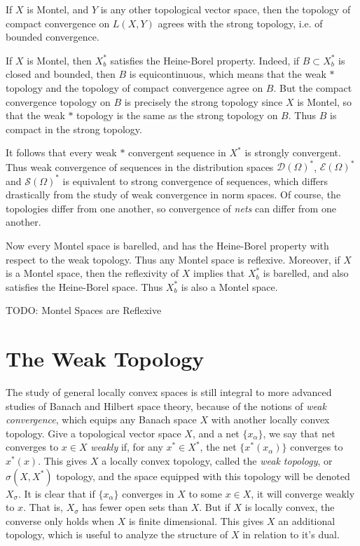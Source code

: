 \begin{theorem}
    If $X$ is Montel, and $Y$ is any other topological vector space, then the topology of compact convergence on $L(X,Y)$ agrees with the strong topology, i.e. of bounded convergence.
\end{theorem}

If $X$ is Montel, then $X^*_b$ satisfies the Heine-Borel property. Indeed, if $B \subset X^*_b$ is closed and bounded, then $B$ is equicontinuous, which means that the weak $*$ topology and the topology of compact convergence agree on $B$. But the compact convergence topology on $B$ is precisely the strong topology since $X$ is Montel, so that the weak $*$ topology is the same as the strong topology on $B$. Thus $B$ is compact in the strong topology.

It follows that every weak $*$ convergent sequence in $X^*$ is strongly convergent. Thus weak convergence of sequences in the distribution spaces $\mathcal{D}(\Omega)^*$, $\mathcal{E}(\Omega)^*$ and $\mathcal{S}(\Omega)^*$ is equivalent to strong convergence of sequences, which differs drastically from the study of weak convergence in norm spaces. Of course, the topologies differ from one another, so convergence of \emph{nets} can differ from one another.

Now every Montel space is barelled, and has the Heine-Borel property with respect to the weak topology. Thus any Montel space is reflexive. Moreover, if $X$ is a Montel space, then the reflexivity of $X$ implies that $X^*_b$ is barelled, and also satisfies the Heine-Borel space. Thus $X^*_b$ is also a Montel space.

TODO: Montel Spaces are Reflexive



\section{The Weak Topology}

The study of general locally convex spaces is still integral to more advanced studies of Banach and Hilbert space theory, because of the notions of \emph{weak convergence}, which equips any Banach space $X$ with another locally convex topology. Give a topological vector space $X$, and a net $\{ x_\alpha \}$, we say that net converges to $x \in X$ \emph{weakly} if, for any $x^* \in X^*$, the net $\{ x^*(x_\alpha) \}$ converges to $x^*(x)$. This gives $X$ a locally convex topology, called the \emph{weak topology}, or $\sigma(X,X^*)$ topology, and the space equipped with this topology will be denoted $X_\sigma$. It is clear that if $\{ x_\alpha \}$ converges in $X$ to some $x \in X$, it will converge weakly to $x$. That is, $X_\sigma$ has fewer open sets than $X$. But if $X$ is locally convex, the converse only holds when $X$ is finite dimensional. This gives $X$ an additional topology, which is useful to analyze the structure of $X$ in relation to it's dual.

